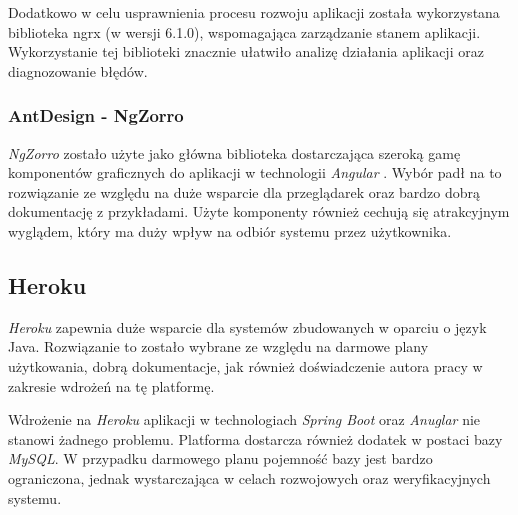 Dodatkowo w celu usprawnienia procesu rozwoju aplikacji została wykorzystana biblioteka ngrx (w wersji 6.1.0), wspomagająca zarządzanie stanem aplikacji. Wykorzystanie tej biblioteki znacznie ułatwiło analizę działania aplikacji oraz diagnozowanie błędów.


\subsubsection{AntDesign - NgZorro}

\textit{NgZorro} zostało użyte jako główna biblioteka dostarczająca szeroką gamę komponentów graficznych do aplikacji w technologii \textit{Angular} \cite{ngzorro}. Wybór padł na to rozwiązanie ze względu na duże wsparcie dla przeglądarek oraz bardzo dobrą dokumentację z przykładami. Użyte komponenty również cechują się atrakcyjnym wyglądem, który ma duży wpływ na odbiór systemu przez użytkownika.

\subsection{Heroku}

\textit{Heroku} zapewnia duże wsparcie dla systemów zbudowanych w oparciu o język Java. Rozwiązanie to zostało wybrane ze względu na darmowe plany użytkowania, dobrą dokumentacje, jak również doświadczenie autora pracy w zakresie wdrożeń na tę platformę. 

Wdrożenie na \textit{Heroku} aplikacji w technologiach \textit{Spring Boot} oraz \textit{Anuglar} nie stanowi żadnego problemu. Platforma dostarcza również dodatek w postaci bazy \textit{MySQL}. W przypadku darmowego planu pojemność bazy jest bardzo ograniczona, jednak wystarczająca w celach rozwojowych oraz weryfikacyjnych systemu.